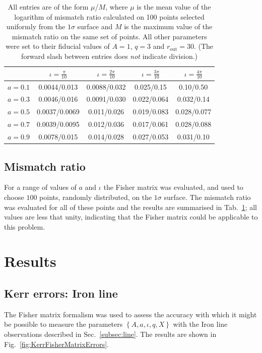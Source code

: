 \begin{table}[h]
\begin{center}
\begin{tabular}{ l | c c c c }
	&$\iota=\frac{\pi}{10}$&$\iota=\frac{2\pi}{10}$&$\iota=\frac{3\pi}{10}$&$\iota=\frac{4\pi}{10}$\\
\hline
$a=0.1$ & 0.0044/0.013	& 0.0088/0.032	& 0.025/0.15	& 0.10/0.50	\\
$a=0.3$ & 0.0046/0.016	& 0.0091/0.030	& 0.022/0.064	& 0.032/0.14	\\
$a=0.5$ & 0.0037/0.0069	& 0.011/0.026	& 0.019/0.083	& 0.028/0.077	\\
$a=0.7$ & 0.0039/0.0095	& 0.012/0.036	& 0.017/0.061	& 0.028/0.088	\\
$a=0.9$ & 0.0078/0.015	& 0.014/0.028	& 0.027/0.053	& 0.031/0.10	\\
\end{tabular}
\end{center}
\caption{All entries are of the form $\mu$/$M$, where $\mu$ is the mean value of the logarithm of mismatch ratio calculated on 100 points selected uniformly from the $1\sigma$ surface and $M$ is the maximum value of the mismatch ratio on the same set of points. All other parameters were set to their fiducial values of $A=1$, $q=3$ and $r_{\textrm{out}}=30$. (The forward slash between entries does \emph{not} indicate division.)}
\label{tab:val}
\end{table}


\subsection{Mismatch ratio}\label{subsubsec:val}
For a range of values of $a$ and $\iota$ the Fisher matrix was evaluated, and used to choose $100$ points, randomly distributed, on the $1\sigma$ surface. The mismatch ratio was evaluated for all of these points and the results are summarised in Tab.\ \ref{tab:val}; all values are less that unity, indicating that the Fisher matrix could be applicable to this problem.

\section{Results}\label{sec:results}
\subsection{Kerr errors: Iron line}\label{subsubsec:kerrres}
The Fisher matrix formalism was used to assess the accuracy with which it might be possible to measure the parameters $\left\{A,a,\iota,q,X\right\}$ with the Iron line observations described in Sec.\ \ref{subsec:line}. The results are shown in Fig.\ \ref{fig:KerrFisherMatrixErrors}.


